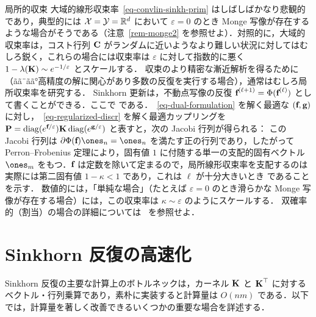 \begin{rem1}{局所的収束}\label{rem-local-conv}
大域的線形収束率~\eqref{eq-convlin-sinkh-prim} はしばしばかなり悲観的であり，典型的には $\mathcal{X}=\mathcal{Y}=\mathbb{R}^d$ において $\varepsilon=0$ のとき Monge 写像が存在するような場合がそうである（注意~\ref{rem-monge2} を参照せよ）．対照的に，大域的収束率は，コスト行列 $\mathrm{\textbf{C}}$ がランダムに近いようなより難しい状況に対してはむしろ鋭く，これらの場合には収束率は $\varepsilon$ に対して指数的に悪く $1-\lambda(\mathrm{\textbf{K}}) \sim e^{-1/\varepsilon}$ とスケールする．
%
収束のより精密な漸近解析を得るために（ãã¨ãã°高精度の解に関心があり多数の反復を実行する場合），通常はむしろ局所収束率を研究する．
%
Sinkhorn 更新は，不動点写像の反復 $\mathrm{\textbf{f}}^{(\ell+1)} = \Phi( \mathrm{\textbf{f}}^{(\ell)} )$ として書くことができる．ここで
である．~\eqref{eq-dual-formulation} を解く最適な $(\mathrm{\textbf{f}},\mathrm{\textbf{g}})$ に対し，~\eqref{eq-regularized-discr} を解く最適カップリングを $\mathrm{\textbf{P}} = \operatorname{diag}(e^{\mathrm{\textbf{f}}/\varepsilon}) \mathrm{\textbf{K}} \operatorname{diag}(e^{\mathrm{\textbf{g}}/\varepsilon})$ と表すと，次の Jacobi 行列が得られる：
この Jacobi 行列は $\partial \Phi(\fD) \ones_n = \ones_n$ を満たす正の行列であり，したがって Perron--Frobenius 定理により，固有値 $1$ に付随する単一の支配的固有ベクトル $\ones_m$ をもつ．$\mathrm{\textbf{f}}$ は定数を除いて定まるので，局所線形収束率を支配するのは実際には第二固有値 $1-\kappa<1$ であり，これは $\ell$ が十分大きいとき
であることを示す．
%
数値的には，「単純な場合」（たとえば $\varepsilon=0$ のとき滑らかな Monge 写像が存在する場合）には，この収束率は $\kappa \sim \varepsilon$ のようにスケールする．
%
双確率的（割当）の場合の詳細については~\citep{knight2008sinkhorn} を参照せよ．
\end{rem1}






\section{Sinkhorn 反復の高速化}

Sinkhorn 反復の主要な計算上のボトルネックは，カーネル $\mathrm{\textbf{K}}$ と $\mathrm{\textbf{K}}^\top$ に対するベクトル・行列乗算であり，素朴に実装すると計算量は $O(nm)$ である．以下では，計算量を著しく改善できるいくつかの重要な場合を詳述する．

